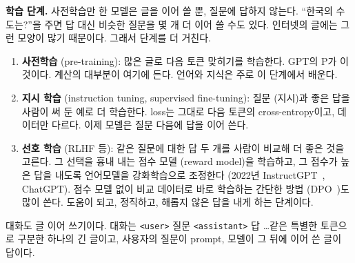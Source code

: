 \documentclass[11pt,a4paper]{article}
\newcommand{\w}[1]{\texttt{#1}}
\begin{document}
\textbf{학습 단계.} 사전학습만 한 모델은 글을 이어 쓸 뿐, 질문에 답하지 않는다. ``한국의 수도는?''을 주면 답 대신 비슷한 질문을 몇 개 더 이어 쓸 수도 있다. 인터넷의 글에는 그런 모양이 많기 때문이다. 그래서 단계를 더 거친다.
\begin{enumerate}[leftmargin=2em]
\item \textbf{사전학습} (pre-training): 많은 글로 다음 토큰 맞히기를 학습한다. GPT의 P가 이것이다. 계산의 대부분이 여기에 든다. 언어와 지식은 주로 이 단계에서 배운다.
\item \textbf{지시 학습} (instruction tuning, supervised fine-tuning): 질문 (지시)과 좋은 답을 사람이 써 둔 예로 더 학습한다. loss는 그대로 다음 토큰의 cross-entropy이고, 데이터만 다르다. 이제 모델은 질문 다음에 답을 이어 쓴다.
\item \textbf{선호 학습} (RLHF 등): 같은 질문에 대한 답 두 개를 사람이 비교해 더 좋은 것을 고른다. 그 선택을 흉내 내는 점수 모델 (reward model)을 학습하고, 그 점수가 높은 답을 내도록 언어모델을 강화학습으로 조정한다 (2022년 InstructGPT~\cite{ouyang2022}, ChatGPT).
점수 모델 없이 비교 데이터로 바로 학습하는 간단한 방법 (DPO~\cite{rafailov2023})도 많이 쓴다. 도움이 되고, 정직하고, 해롭지 않은 답을 내게 하는 단계이다.
\end{enumerate}
대화도 글 이어 쓰기이다. 대화는 \w{<user>} 질문 \w{<assistant>} 답 \dots 같은 특별한 토큰으로 구분한 하나의 긴 글이고, 사용자의 질문이 prompt, 모델이 그 뒤에 이어 쓴 글이 답이다.
\end{document}
